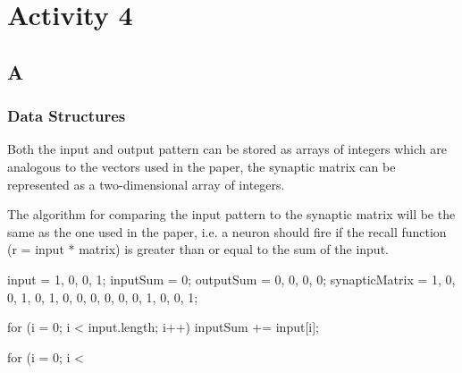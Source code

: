\documentclass{article}
\begin{document}
\newpage
\section*{Activity 4}
\subsection*{A}
\subsubsection*{Data Structures}
Both the input and output pattern can be stored as arrays of integers which are analogous to the vectors used in the paper, the synaptic matrix can be represented as a two-dimensional array of integers.

The algorithm for comparing the input pattern to the synaptic matrix will be the same as the one used in the paper, i.e. a neuron should fire if the recall function (r = input * matrix) is greater than or equal to the sum of the input.

input = {1, 0, 0, 1};
inputSum = 0;
outputSum = {0, 0, 0, 0};
synapticMatrix = {{1, 0, 0, 1}, {0, 1, 0, 0}, {0, 0, 0, 0}, {1, 0, 0, 1}};

for (i = 0; i < input.length; i++) {
	inputSum += input[i];
}

for (i = 0; i < 
\end{document}
